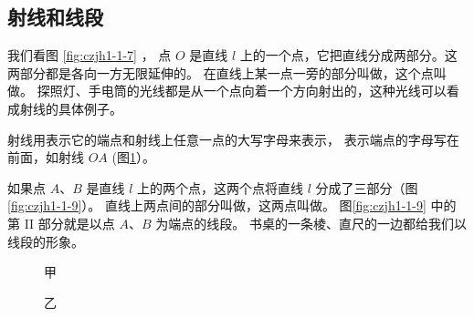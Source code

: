 \subsection{射线和线段}\label{subsec:czjh1-1-2}

我们看图 \ref{fig:czjh1-1-7} ， 点 $O$ 是直线 $l$ 上的一个点，它把直线分成两部分。这两部分都是各向一方无限延伸的。
在直线上某一点一旁的部分叫做，这个点叫做。
探照灯、手电筒的光线都是从一个点向着一个方向射出的，这种光线可以看成射线的具体例子。


\begin{figure}[htbp]
    \centering
    \begin{minipage}[b]{7cm}
        \centering
        
        \caption{}\label{fig:czjh1-1-7}
    \end{minipage}
    \qquad
    \begin{minipage}[b]{7cm}
        \centering
        
        \caption{}\label{fig:czjh1-1-8}
    \end{minipage}
\end{figure}


射线用表示它的端点和射线上任意一点的大写字母来表示，
表示端点的字母写在前面，如射线 $OA$ (图\ref{fig:czjh1-1-8}）。

如果点 $A$、$B$ 是直线 $l$ 上的两个点，这两个点将直线 $l$ 分成了三部分（图\ref{fig:czjh1-1-9}）。
直线上两点间的部分叫做，这两点叫做。
图\ref{fig:czjh1-1-9} 中的第 II 部分就是以点 $A$、$B$ 为端点的线段。
书桌的一条棱、直尺的一边都给我们以线段的形象。

\begin{figure}[htbp]
    \centering
    \begin{minipage}[b]{6cm}
        \centering
        
        \caption{}\label{fig:czjh1-1-9}
    \end{minipage}
    \qquad
    \begin{minipage}[b]{9cm}
        \centering
        \begin{minipage}[b]{3cm}
            \centering
            
            \caption*{甲}
        \end{minipage}
        \quad
        \begin{minipage}[b]{3cm}
            \centering
            
            \caption*{乙}
        \end{minipage}
        \caption{}\label{fig:czjh1-1-10}
    \end{minipage}
\end{figure}


